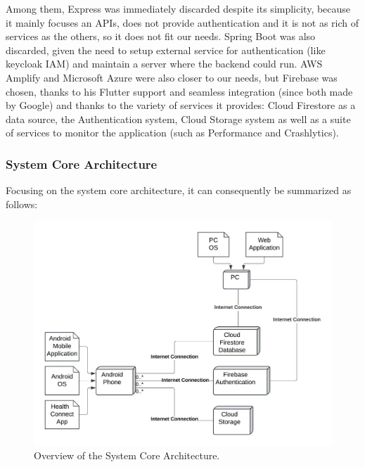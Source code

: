 \newpage
\noindent Among them, Express was immediately discarded despite its simplicity, because it mainly focuses an APIs, does not provide authentication and it is not as rich of services as the others, so it does not fit our needs. Spring Boot was also discarded, given the need to setup external service for authentication (like keycloak IAM) and maintain a server where the backend could run. AWS Amplify and Microsoft Azure were also closer to our needs, but Firebase was chosen, thanks to his Flutter support and seamless integration (since both made by Google) and thanks to the variety of services it provides: Cloud Firestore as a data source, the Authentication system, Cloud Storage system as well as a suite of services to monitor the application (such as Performance and Crashlytics).
\subsubsection{System Core Architecture}

Focusing on the system core architecture, it can consequently be summarized as follows:
\begin{figure}
    \includegraphics[width=1.0\linewidth]{./images/system_architecture.jpeg}
    \caption{Overview of the System Core Architecture.}
    \label{fig:systemArchitecture}
\end{figure}

